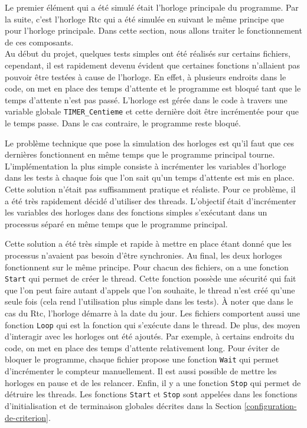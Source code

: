 \documentclass[a4paper]{article}
\begin{document}
Le premier élément qui a été simulé était l'horloge principale du programme. Par
la suite, c'est l'horloge Rtc qui a été simulée en suivant le même principe que
pour l'horloge principale. Dans cette section, nous allons traiter le
fonctionnement de ces composants.\\

Au début du projet, quelques tests simples ont été réalisés sur certains
fichiers, cependant, il est rapidement devenu évident que certaines fonctions
n'allaient pas pouvoir être testées à cause de l'horloge. En effet, à plusieurs
endroits dans le code, on met en place des temps d'attente et le programme est
bloqué tant que le temps d'attente n'est pas passé. L'horloge est gérée dans le
code à travers une variable globale \verb|TIMER_Centieme| et cette dernière
doit être incrémentée pour que le temps passe. Dans le cas contraire, le
programme reste bloqué.

Le problème technique que pose la simulation des horloges est qu'il faut que ces
dernières fonctionnent en même temps que le programme principal tourne.
L'implémentation la plus simple consiste à incrémenter les variables d'horloge
dans les tests à chaque fois que l'on sait qu'un temps d'attente est mis en
place. Cette solution n'était pas suffisamment pratique et réaliste. Pour ce
problème, il a été très rapidement décidé d'utiliser des threads. L'objectif
était d'incrémenter les variables des horloges dans des fonctions simples
s'exécutant dans un processus séparé en même temps que le programme principal.

Cette solution a été très simple et rapide à mettre en place étant donné que les
processus n'avaient pas besoin d'être synchronies. Au final, les deux horloges
fonctionnent sur le même principe. Pour chacun des fichiers, on a une fonction
\verb|Start| qui permet de créer le thread. Cette fonction possède une
sécurité qui fait que l'on peut faire autant d'appels que l'on souhaite, le
thread n'est créé qu'une seule fois (cela rend l'utilisation plus simple dans
les tests). À noter que dans le cas du Rtc, l'horloge démarre à la date du jour.
Les fichiers comportent aussi une fonction \verb|Loop| qui est la fonction
qui s'exécute dans le thread. De plus, des moyen d'interagir avec les horloges ont été
ajoutés. Par exemple, à certains endroits du code, on met en place
des temps d'attente relativement long. Pour éviter de bloquer le programme,
chaque fichier propose une fonction \verb|Wait| qui permet d'incrémenter le
compteur manuellement. Il est aussi possible de mettre les horloges en pause et
de les relancer. Enfin, il y a une fonction \verb|Stop| qui permet de
détruire les threads. Les fonctions \verb|Start| et \verb|Stop| sont
appelées dans les fonctions d'initialisation et de terminaison globales décrites
dans la Section \ref{configuration-de-criterion}.\\
\end{document}
